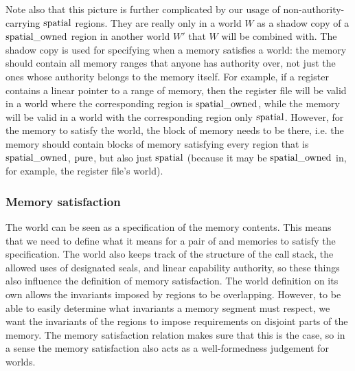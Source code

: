 \begin{jversion}
Note also that this picture is further complicated by our usage of non-authority-carrying $\mathrm{spatial}$ regions.
They are really only in a world $W$ as a shadow copy of a $\mathrm{spatial\_owned}$ region in another world $W'$ that $W$ will be combined with.
The shadow copy is used for specifying when a memory satisfies a world: the memory should contain all memory ranges that anyone has authority over, not just the ones whose authority belongs to the memory itself.
For example, if a register contains a linear pointer to a range of memory, then the register file will be valid in a world where the corresponding region is $\mathrm{spatial\_owned}$, while the memory will be valid in a world with the corresponding region only $\mathrm{spatial}$.
However, for the memory to satisfy the world, the block of memory needs to be there, i.e. the memory should contain blocks of memory satisfying every region that is $\mathrm{spatial\_owned}$, $\mathrm{pure}$, but also just $\mathrm{spatial}$ (because it may be $\mathrm{spatial\_owned}$ in, for example, the register file's world).

\subsubsection{Memory satisfaction}
\label{subsubsec:mem-sat}
The world can be seen as a specification of the memory contents.
This means that we need to define what it means for a pair of \trgcm{} and \srccm{} memories to satisfy the specification.
The world also keeps track of the structure of the call stack, the allowed uses of designated seals, and linear capability authority, so these things also influence the definition of memory satisfaction.
The world definition on its own allows the invariants imposed by regions to be overlapping.
However, to be able to easily determine what invariants a memory segment must respect, we want the invariants of the regions to impose requirements on disjoint parts of the memory.
The memory satisfaction relation makes sure that this is the case, so in a sense the memory satisfaction also acts as a well-formedness judgement for worlds.


\end{jversion}
